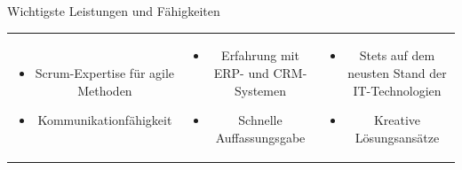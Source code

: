 \documentclass{resume} %
\begin{document}
%
%


    

\begin{rSection}
    {Wichtigste Leistungen und Fähigkeiten}

    \begin{tabular}{ccc}
        \begin{minipage}{0.3\textwidth}
        \begin{itemize}
        \item \raggedright{Scrum-Expertise für agile Methoden}
        \item Kommunikationfähigkeit
        \end{itemize}
        \end{minipage} &
        \begin{minipage}{0.3\textwidth}
        \begin{itemize}
        \item \raggedright{Erfahrung mit ERP- und CRM-Systemen}
        \item Schnelle Auffassungsgabe
        \end{itemize}
        \end{minipage} &
        \begin{minipage}{0.3\textwidth}
        \begin{itemize}
        \item Stets auf dem neusten Stand der IT-Technologien
        \item Kreative Lösungsansätze
        \end{itemize}
        \end{minipage}
        \end{tabular}

\end{rSection}
\end{document}
